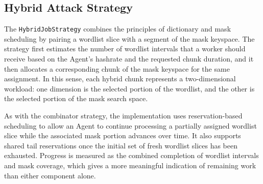 \subsection{Hybrid Attack Strategy}

The \verb|HybridJobStrategy| combines the principles of dictionary and mask scheduling by pairing a wordlist slice with a segment of the mask keyspace. The strategy first estimates the number of wordlist intervals that a worker should receive based on the Agent's hashrate and the requested chunk duration, and it then allocates a corresponding chunk of the mask keyspace for the same assignment. In this sense, each hybrid chunk represents a two-dimensional workload: one dimension is the selected portion of the wordlist, and the other is the selected portion of the mask search space.

As with the combinator strategy, the implementation uses reservation-based scheduling to allow an Agent to continue processing a partially assigned wordlist slice while the associated mask portion advances over time. It also supports shared tail reservations once the initial set of fresh wordlist slices has been exhausted. Progress is measured as the combined completion of wordlist intervals and mask coverage, which gives a more meaningful indication of remaining work than either component alone.
    

